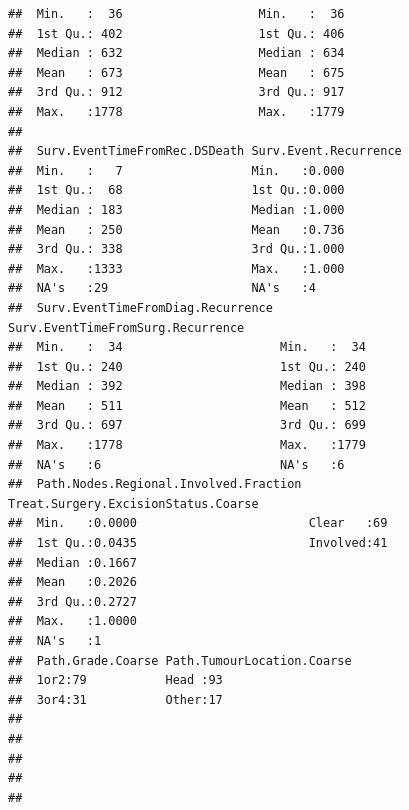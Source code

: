 \documentclass{article}
\begin{document}
\begin{knitrout}
\begin{kframe}
\begin{verbatim}
##  Min.   :  36                   Min.   :  36                  
##  1st Qu.: 402                   1st Qu.: 406                  
##  Median : 632                   Median : 634                  
##  Mean   : 673                   Mean   : 675                  
##  3rd Qu.: 912                   3rd Qu.: 917                  
##  Max.   :1778                   Max.   :1779                  
##                                                               
##  Surv.EventTimeFromRec.DSDeath Surv.Event.Recurrence
##  Min.   :   7                  Min.   :0.000        
##  1st Qu.:  68                  1st Qu.:0.000        
##  Median : 183                  Median :1.000        
##  Mean   : 250                  Mean   :0.736        
##  3rd Qu.: 338                  3rd Qu.:1.000        
##  Max.   :1333                  Max.   :1.000        
##  NA's   :29                    NA's   :4            
##  Surv.EventTimeFromDiag.Recurrence Surv.EventTimeFromSurg.Recurrence
##  Min.   :  34                      Min.   :  34                     
##  1st Qu.: 240                      1st Qu.: 240                     
##  Median : 392                      Median : 398                     
##  Mean   : 511                      Mean   : 512                     
##  3rd Qu.: 697                      3rd Qu.: 699                     
##  Max.   :1778                      Max.   :1779                     
##  NA's   :6                         NA's   :6                        
##  Path.Nodes.Regional.Involved.Fraction Treat.Surgery.ExcisionStatus.Coarse
##  Min.   :0.0000                        Clear   :69                        
##  1st Qu.:0.0435                        Involved:41                        
##  Median :0.1667                                                           
##  Mean   :0.2026                                                           
##  3rd Qu.:0.2727                                                           
##  Max.   :1.0000                                                           
##  NA's   :1                                                                
##  Path.Grade.Coarse Path.TumourLocation.Coarse
##  1or2:79           Head :93                  
##  3or4:31           Other:17                  
##                                              
##                                              
##                                              
##                                              
## 
\end{verbatim}
\begin{alltt}
\hlstd{(}\hlstd{(} 

\end{alltt}
\end{kframe}
\end{knitrout}
\end{document}

